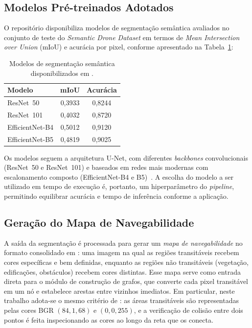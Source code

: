 \documentclass[
    12pt,
    openright,
    oneside,
    a4paper,
    english,
    brazil
]{abntex2}
\begin{document}
\subsection{Modelos Pré-treinados Adotados}

O repositório \cite{junior2024_models} disponibiliza modelos de segmentação semântica avaliados no conjunto de teste do \emph{Semantic Drone Dataset} em termos de \emph{Mean Intersection over Union} (mIoU) e acurácia por pixel, conforme apresentado na Tabela~\ref{tab:modelos_segmentacao}:

\begin{table}[H]
    \centering
    \caption{Modelos de segmentação semântica disponibilizados em \cite{junior2024_models}.}
    \label{tab:modelos_segmentacao}
    \begin{tabular}{lcc}
        \toprule
        \textbf{Modelo} & \textbf{mIoU} & \textbf{Acurácia} \\
        \midrule
        ResNet~50        & 0,3933 & 0,8244 \\
        ResNet~101       & 0,4032 & 0,8720 \\
        EfficientNet-B4  & 0,5012 & 0,9120 \\
        EfficientNet-B5  & 0,4819 & 0,9025 \\
        \bottomrule
    \end{tabular}
\end{table}

Os modelos seguem a arquitetura U-Net, com diferentes \textit{backbones} convolucionais (ResNet~50 e ResNet~101) e baseados em redes mais modernas com escalonamento composto (EfficientNet-B4 e B5)~\cite{junior2024}. A escolha do modelo a ser utilizado em tempo de execução é, portanto, um hiperparâmetro do \textit{pipeline}, permitindo equilibrar acurácia e tempo de inferência conforme a aplicação.

\subsection{Geração do Mapa de Navegabilidade}

A saída da segmentação é processada para gerar um \emph{mapa de navegabilidade} no formato consolidado em \cite{junior2025_rrt}: uma imagem na qual as regiões transitáveis recebem cores específicas e bem definidas, enquanto as regiões não transitáveis (vegetação, edificações, obstáculos) recebem cores distintas. Esse mapa serve como entrada direta para o módulo de construção de grafos, que converte cada pixel transitável em um nó e estabelece arestas entre vizinhos imediatos. Em particular, neste trabalho adota-se o mesmo critério de \cite{junior2025_rrt}: as áreas transitáveis são representadas pelas cores BGR $(84, 1, 68)$ e $(0, 0, 255)$, e a verificação de colisão entre dois pontos é feita inspecionando as cores ao longo da reta que os conecta.
\end{document}
